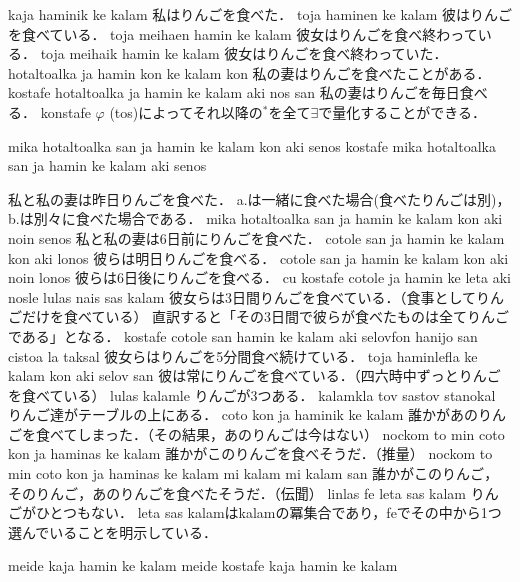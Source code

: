 \documentclass[../../main-detail.tex]{subfiles}
\begin{document}
\begin{exe}
    \ex kaja haminik ke kalam
    \glt 私はりんごを食べた．
    \ex toja haminen ke kalam
    \glt 彼はりんごを食べている．
    \ex toja meihaen hamin ke kalam
    \glt 彼女はりんごを食べ終わっている．
    \ex toja meihaik hamin ke kalam
    \glt 彼女はりんごを食べ終わっていた．
    \ex hotaltoalka ja hamin kon ke kalam kon
    \glt 私の妻はりんごを食べたことがある．
    \ex kostafe hotaltoalka ja hamin ke kalam aki nos san
    \glt 私の妻はりんごを毎日食べる．
    \glt konstafe $\varphi$ (tos)によってそれ以降の$^*$を全て$\exists$で量化することができる．
    \ex \begin{xlist}
        \ex mika hotaltoalka san ja hamin ke kalam kon aki senos
        \ex kostafe mika hotaltoalka san ja hamin ke kalam aki senos
    \end{xlist}
    \glt 私と私の妻は昨日りんごを食べた．
    \glt a.は一緒に食べた場合(食べたりんごは別)，b.は別々に食べた場合である．
    \ex mika hotaltoalka san ja hamin ke kalam kon aki noin senos
    \glt 私と私の妻は6日前にりんごを食べた．
    \ex cotole san ja hamin ke kalam kon aki lonos
    \glt 彼らは明日りんごを食べる．
    \ex cotole san ja hamin ke kalam kon aki noin lonos
    \glt 彼らは6日後にりんごを食べる．
    \ex cu kostafe cotole ja hamin ke leta aki nosle lulas nais sas kalam
    \glt 彼女らは3日間りんごを食べている．（食事としてりんごだけを食べている）
    \glt 直訳すると「その3日間で彼らが食べたものは全てりんごである」となる．
    \ex kostafe cotole san hamin ke kalam aki selovfon hanijo san cistoa la taksal
    \glt 彼女らはりんごを5分間食べ続けている．
    \ex toja haminlefla ke kalam kon aki selov san
    \glt 彼は常にりんごを食べている．（四六時中ずっとりんごを食べている）
    \ex lulas kalamle
    \glt りんごが3つある．
    \ex kalamkla tov sastov stanokal
    \glt りんご達がテーブルの上にある．
    \ex coto kon ja haminik ke kalam
    \glt 誰かがあのりんごを食べてしまった．（その結果，あのりんごは今はない）
    \ex nockom to min coto kon ja haminas ke kalam
    \glt 誰かがこのりんごを食べそうだ．（推量）
    \ex nockom to min coto kon ja haminas ke kalam mi kalam mi kalam san
    \glt 誰かがこのりんご，そのりんご，あのりんごを食べたそうだ．（伝聞）
    \ex linlas fe leta sas kalam
    \glt りんごがひとつもない．
    \glt leta sas kalamはkalamの冪集合であり，feでその中から1つ選んでいることを明示している．
    \ex \begin{xlist}
        \ex meide kaja hamin ke kalam
        \ex meide kostafe kaja hamin ke kalam
    \end{xlist}

\end{exe}
\end{document}
